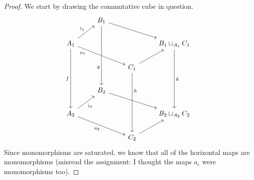 \documentclass[a4paper,11pt,openany]{scrartcl}
\begin{document}
~\\
\begin{proof}
    We start by drawing the commutative cube in question.
    \[\begin{tikzcd}
        & {B_1} \\
        {A_1} &&& {B_1\sqcup_{A_1}C_1} \\
        && {C_1} \\
        & {B_2} \\
        {A_2} &&& {B_2\sqcup_{A_2}C_2} \\
        && {C_2}
        \arrow["h"{pos=0.3}, from=3-3, to=6-3, crossing over]
        \arrow["{a_2}"', from=5-1, to=6-3]
        \arrow[from=6-3, to=5-4]
        \arrow["{i_2}"', from=5-1, to=4-2]
        \arrow[from=4-2, to=5-4]
        \arrow["k", from=2-4, to=5-4]
        \arrow["f"', from=2-1, to=5-1]
        \arrow["{a_1}"'{pos=0.2}, from=2-1, to=3-3, crossing over]
        \arrow[from=1-2, to=2-4]
        \arrow[from=3-3, to=2-4]
        \arrow["{i_1}", from=2-1, to=1-2]
        \arrow["g"'{pos=0.7}, from=1-2, to=4-2]
    \end{tikzcd}\]
    Since monomorphisms are saturated, we know that all of the horizontal maps
    are monomorphisms (misread the assignment: I thought the maps $a_\epsilon$
    were monomorphisms too).


\end{proof}
\end{document}
